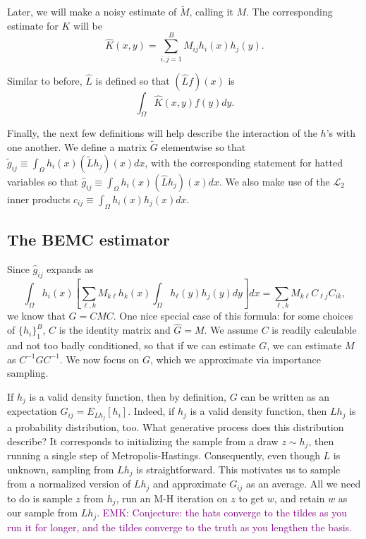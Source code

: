 \documentclass{article}
\newcommand\EMK[1]{\textcolor{purple}{EMK: #1}}
\begin{document}
Later, we will make a noisy estimate of $\tilde{M}$, calling it $M$. The corresponding estimate for $K$ will be 
\begin{equation}
\label{eqn:khatdef}
\hat{K}(x,y) = \sum_{i,j=1}^B M_{ij} h_i(x)h_j(y).\end{equation}

Similar to before, $\hat{L}$ is defined so that $(\hat{L}f)(x)$ is $$\int_{\Omega}\hat{K}(x,y)f(y)dy.$$


Finally, the next few definitions will help describe the interaction of the $h$'s with one another. We define a matrix $\tilde{G}$ elementwise so that $\tilde{g}_{ij}\equiv \int_{\Omega} h_i(x)(\tilde{L}h_j)(x)dx$, with the corresponding statement for hatted variables so that $\hat{g}_{ij}\equiv \int_{\Omega} h_i(x)(\hat{L}h_j)(x)dx$. We also make use of the $\mathcal{L}_2$ inner products $c_{ij}\equiv \int_{\Omega} h_i(x)h_j(x)dx$.

\subsection{The BEMC estimator}

Since $\hat{g}_{ij}$ expands as $$ \int_{\Omega} h_i(x)\left[\sum_{\ell,k} M_{k\ell}h_k(x)\int_{\Omega} h_\ell(y)h_j(y)dy\right]dx= \sum_{\ell,k} M_{k\ell}C_{\ell j}C_{ik},$$ we know that $\hat{G}=CMC$. One nice special case of this formula: for some choices of $\{h_i\}_1^B$, $C$ is the identity matrix and $\hat{G}=M$. We assume $C$ is readily calculable and not too badly conditioned, so that if we can estimate $G$, we can estimate $M$ as $C^{-1}GC^{-1}$. We now focus on $G$, which we approximate via importance sampling. 

If $h_j$ is a valid density function, then by definition, $G$ can be written as an expectation $G_{ij} = E_{Lh_j}[h_i]$. Indeed, if $h_j$ is a valid density function, then $Lh_j$ is a probability distribution, too. What generative process does this distribution describe? It corresponds to initializing the sample from a draw $z\sim h_j$, then running a single step of Metropolis-Hastings. Consequently, even though $L$ is unknown, sampling from $Lh_j$ is straightforward. This motivates us to sample from a normalized version of $Lh_j$ and approximate $G_{ij}$ as an average. All we need to do is sample $z$ from $h_j$, run an M-H iteration on $z$ to get $w$, and retain $w$ as our sample from $Lh_j$. \EMK{Conjecture: the hats converge to the tildes as you run it for longer, and the tildes converge to the truth as you lengthen the basis.}
\end{document}
